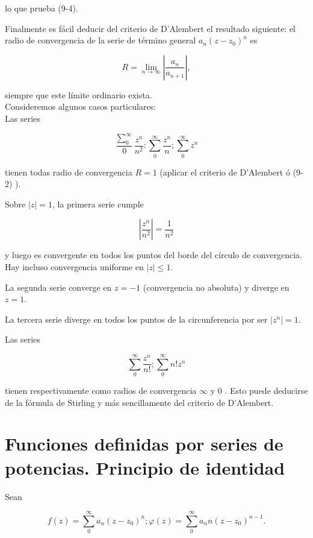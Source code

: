 \documentclass[10pt]{article}
\theoremstyle{plain}
\theoremstyle{definition}
\theoremstyle{remark}
\begin{document}
lo que prueba (9-4).

Finalmente es fácil deducir del criterio de D'Alembert el resultado siguiente: el radio de convergencia de la serie de término general $a_{n}\left(z-z_{0}\right)^{n}$ es


\begin{equation*}
R=\lim _{n \rightarrow \infty}\left|\frac{a_{n}}{a_{n+1}}\right|, \tag{9-5}
\end{equation*}


siempre que este límite ordinario exista.\\
Consideremos algunos casos particulares:\\
Las series

$$
\frac{\sum_{0}^{\infty}}{0} \frac{z^{n}}{n^{2}}: \sum_{0}^{\infty} \frac{z^{n}}{n} ; \sum_{0}^{\infty} z^{n}
$$

tienen todas radio de convergencia $R=1$ (aplicar el criterio de D'Alembert ó (9-2) ).

Sobre $|z|=1$, la primera serie cumple

$$
\left|\frac{z^{n}}{n^{2}}\right|=\frac{1}{n^{2}}
$$

y luego es convergente en todos los puntos del borde del círculo de convergencia. Hay incluso convergencia uniforme en $|z| \leqslant 1$.

La segunda serie converge en $z=-1$ (convergencia no absoluta) y diverge en $z=1$.

La tercera serie diverge en todos los puntos de la circunferencia por ser $\left|z^{n}\right|=1$.

Las series

$$
\sum_{0}^{\infty} \frac{z^{n}}{n!} ; \sum_{0}^{\infty} n!z^{n}
$$

tienen respectivamente como radios de convergencia $\infty$ y 0 . Esto puede deducirse de la fórmula de Stirling y más sencillamente del criterio de D'Alembert.\\
\section{Funciones definidas por series de potencias. Principio de identidad}

Sean


\begin{equation*}
f(z)=\sum_{0}^{\infty} a_{n}\left(z-z_{0}\right)^{n} ; \varphi(z)=\sum_{0}^{\infty} a_{n} n\left(z-z_{0}\right)^{n-1} . \tag{10-1}
\end{equation*}
\end{document}
